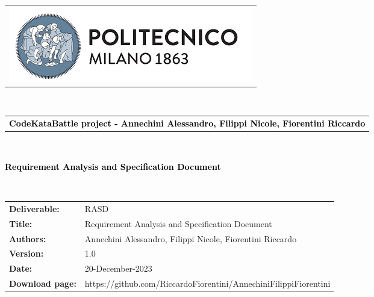 


\begin{titlepage}

{\begin{table}[t!]
\centering
\begin{tabu} to \textwidth { X[3,c,m]}
    \includegraphics[scale=0.5]{Images/PolimiLogo} 
\end{tabu}
~\\ [2cm]
\begin{tabu} to \textwidth {X[2,l,m] }
    \textcolor{Black}{\textbf{\small{CodeKataBattle project - Annechini Alessandro, Filippi Nicole, Fiorentini Riccardo}}}
\end{tabu}
\end{table}}~\\ [5cm]


\begin{flushleft}
{\textcolor{Black}{\textbf{\Huge{Requirement Analysis and Specification
        Document}}}} \\ [1cm]
\end{flushleft}

~\\[2cm]

\begin{table}[h!]
\begin{tabu} to \textwidth { X[0.25,r,p] X[0.7,l,p] }
\hline

\textbf{Deliverable:} & RASD\\
\textbf{Title:} & Requirement Analysis and Specification Document \\
\textbf{Authors:} & Annechini Alessandro, Filippi Nicole, Fiorentini Riccardo\\
\textbf{Version:} & 1.0 \\ 
\textbf{Date:} & 20-December-2023 \\
\textbf{Download page:} & https://github.com/RiccardoFiorentini/AnnechiniFilippiFiorentini \\
\hline
\end{tabu}
\end{table}

\end{titlepage}



